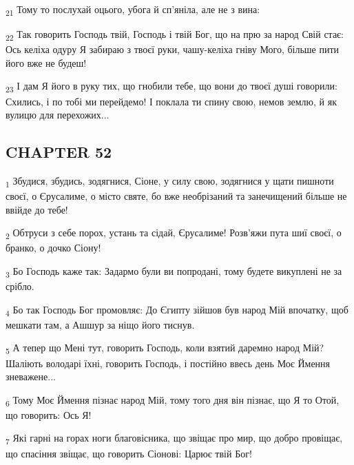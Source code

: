 \begin{tcolorbox}
\textsubscript{21} Тому то послухай оцього, убога й сп'яніла, але не з вина:
\end{tcolorbox}
\begin{tcolorbox}
\textsubscript{22} Так говорить Господь твій, Господь і твій Бог, що на прю за народ Свій стає: Ось келіха одуру Я забираю з твоєї руки, чашу-келіха гніву Мого, більше пити його вже не будеш!
\end{tcolorbox}
\begin{tcolorbox}
\textsubscript{23} І дам Я його в руку тих, що гнобили тебе, що вони до твоєї душі говорили: Схились, і по тобі ми перейдемо! І поклала ти спину свою, немов землю, й як вулицю для перехожих...
\end{tcolorbox}
\subsection{CHAPTER 52}
\begin{tcolorbox}
\textsubscript{1} Збудися, збудись, зодягнися, Сіоне, у силу свою, зодягнися у щати пишноти своєї, о Єрусалиме, о місто святе, бо вже необрізаний та занечищений більше не ввійде до тебе!
\end{tcolorbox}
\begin{tcolorbox}
\textsubscript{2} Обтруси з себе порох, устань та сідай, Єрусалиме! Розв'яжи пута шиї своєї, о бранко, о дочко Сіону!
\end{tcolorbox}
\begin{tcolorbox}
\textsubscript{3} Бо Господь каже так: Задармо були ви попродані, тому будете викуплені не за срібло.
\end{tcolorbox}
\begin{tcolorbox}
\textsubscript{4} Бо так Господь Бог промовляє: До Єгипту зійшов був народ Мій впочатку, щоб мешкати там, а Ашшур за ніщо його тиснув.
\end{tcolorbox}
\begin{tcolorbox}
\textsubscript{5} А тепер що Мені тут, говорить Господь, коли взятий даремно народ Мій? Шаліють володарі їхні, говорить Господь, і постійно ввесь день Моє Ймення зневажене...
\end{tcolorbox}
\begin{tcolorbox}
\textsubscript{6} Тому Моє Ймення пізнає народ Мій, тому того дня він пізнає, що Я то Отой, що говорить: Ось Я!
\end{tcolorbox}
\begin{tcolorbox}
\textsubscript{7} Які гарні на горах ноги благовісника, що звіщає про мир, що добро провіщає, що спасіння звіщає, що говорить Сіонові: Царює твій Бог!
\end{tcolorbox}

